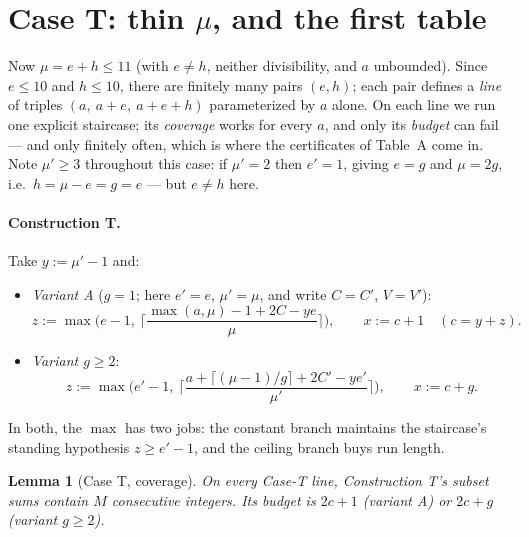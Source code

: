 \documentclass[11pt,reqno]{amsart}
\theoremstyle{plain}
\newtheorem{lemma}[theorem]{Lemma}
\theoremstyle{definition}
\theoremstyle{remark}
\begin{document}

\section{Case T: thin \texorpdfstring{$\mu$}{mu}, and the first table}\label{sec:caseT-friendly}

Now $\mu = e + h \le 11$ (with $e \ne h$, neither divisibility, and $a$
unbounded). Since $e \le 10$ and $h \le 10$, there are finitely many pairs
$(e, h)$; each pair defines a \emph{line} of triples $(a,\ a + e,\ a + e + h)$
parameterized by $a$ alone. On each line we run one explicit staircase; its
\emph{coverage} works for every $a$, and only its \emph{budget} can fail --- and
only finitely often, which is where the certificates of Table~A come in. Note
$\mu' \ge 3$ throughout this case: if $\mu' = 2$ then $e' = 1$, giving $e = g$
and $\mu = 2g$, i.e.\ $h = \mu - e = g = e$ --- but $e \ne h$ here.

\paragraph{Construction T.} Take $y := \mu' - 1$ and:
\begin{itemize}
\item \emph{Variant A} ($g = 1$; here $e' = e$, $\mu' = \mu$, and write $C = C'$,
      $V = V'$):
      \[
        z := \max\Big( e - 1,\ \Big\lceil \frac{\max(a, \mu) - 1 + 2C - ye}{\mu}
        \Big\rceil \Big), \qquad x := c + 1 \quad (c = y + z) .
      \]
\item \emph{Variant $g \ge 2$}:
      \[
        z := \max\Big( e' - 1,\ \Big\lceil \frac{a + \lceil (\mu-1)/g \rceil +
        2C' - y e'}{\mu'} \Big\rceil \Big), \qquad x := c + g .
      \]
\end{itemize}
In both, the $\max$ has two jobs: the constant branch maintains the staircase's
standing hypothesis $z \ge e' - 1$, and the ceiling branch buys run length.

\begin{lemma}[Case T, coverage]\label{lem:caseT-friendly}
On every Case-T line, Construction T's subset sums contain $M$ consecutive
integers. Its budget is $2c + 1$ (variant A) or $2c + g$ (variant $g \ge 2$).
\end{lemma}
\end{document}
